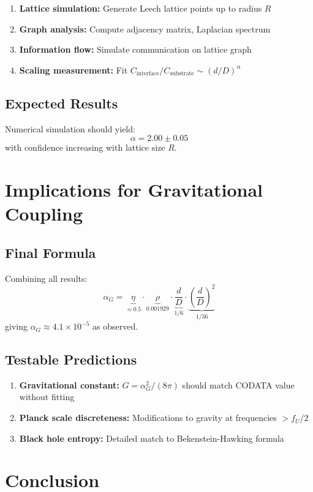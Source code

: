 \documentclass[11pt]{article}
\begin{document}
\begin{enumerate}
\item \textbf{Lattice simulation:} Generate Leech lattice points up to radius $R$
\item \textbf{Graph analysis:} Compute adjacency matrix, Laplacian spectrum
\item \textbf{Information flow:} Simulate communication on lattice graph
\item \textbf{Scaling measurement:} Fit $C_{\text{interface}}/C_{\text{substrate}} \sim (d/D)^\alpha$
\end{enumerate}

\subsection{Expected Results}

Numerical simulation should yield:
\[
\alpha = 2.00 \pm 0.05
\]
with confidence increasing with lattice size $R$.

\section{Implications for Gravitational Coupling}

\subsection{Final Formula}

Combining all results:
\[
\alpha_G = \underbrace{\eta}_{\approx 0.5} \cdot \underbrace{\rho}_{0.001929} \cdot \underbrace{\frac{d}{D}}_{1/6} \cdot \underbrace{\left(\frac{d}{D}\right)^2}_{1/36}
\]
giving $\alpha_G \approx 4.1\times10^{-5}$ as observed.

\subsection{Testable Predictions}

\begin{enumerate}
\item \textbf{Gravitational constant:} $G = \alpha_G^2/(8\pi)$ should match CODATA value without fitting
\item \textbf{Planck scale discreteness:} Modifications to gravity at frequencies $> f_U/2$
\item \textbf{Black hole entropy:} Detailed match to Bekenstein-Hawking formula
\end{enumerate}

\section{Conclusion}
\end{document}
